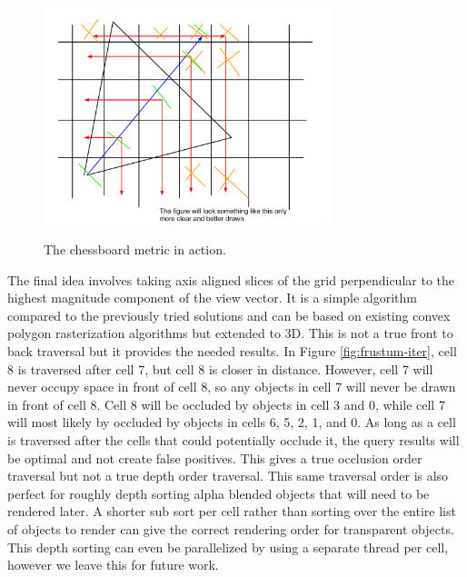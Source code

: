 \documentclass[12pt]{ucthesis}
\newcommand{\captionfonts}{\small\bf\ssp}
\begin{document}
\begin{figure}
\begin{center}
\includegraphics[width=0.75\textwidth]{Images/chess-metric.pdf}
\captionfonts
\caption[Chessboard Metric]{The chessboard metric in action.}
\label{fig:chess-metric}
\end{center}
\end{figure}

The final idea involves taking axis aligned slices of the grid perpendicular to the highest magnitude component of the view vector.
It is a simple algorithm compared to the previously tried solutions and can be based on existing convex polygon rasterization algorithms but extended to 3D.
This is not a true front to back traversal but it provides the needed results.
In Figure \ref{fig:frustum-iter}, cell 8 is traversed after cell 7, but cell 8 is closer in distance.
However, cell 7 will never occupy space in front of cell 8, so any objects in cell 7 will never be drawn in front of cell 8.
Cell 8 will be occluded by objects in cell 3 and 0, while cell 7 will most likely by occluded by objects in cells 6, 5, 2, 1, and 0.
As long as a cell is traversed after the cells that could potentially occlude it, the query results will be optimal and not create false positives.
This gives a true occlusion order traversal but not a true depth order traversal.
This same traversal order is also perfect for roughly depth sorting alpha blended objects that will need to be rendered later.
A shorter sub sort per cell rather than sorting over the entire list of objects to render can give the correct rendering order for transparent objects.
This depth sorting can even be parallelized by using a separate thread per cell, however we leave this for future work.
\end{document}
